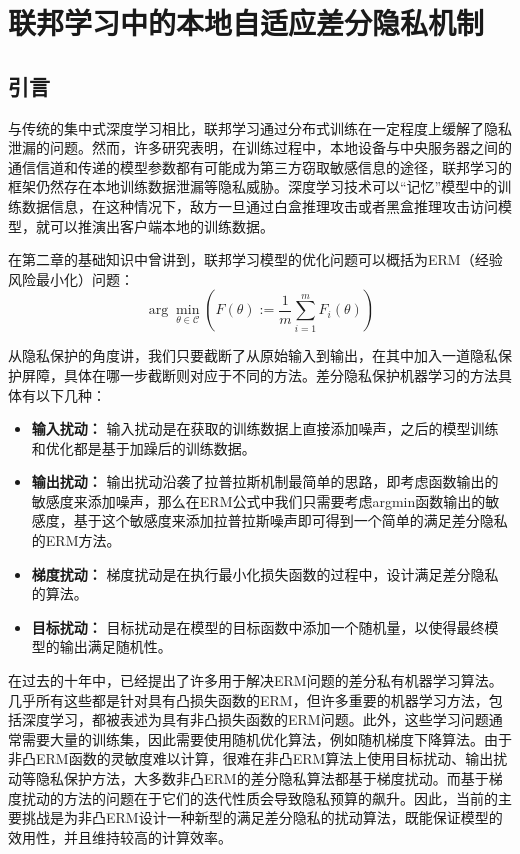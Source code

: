 \chapter{联邦学习中的本地自适应差分隐私机制}

\label{ch3}

\section{引言}
与传统的集中式深度学习相比，联邦学习通过分布式训练在一定程度上缓解了隐私泄漏的问题。然而，许多研究表明，在训练过程中，本地设备与中央服务器之间的通信信道和传递的模型参数都有可能成为第三方窃取敏感信息的途径，联邦学习的框架仍然存在本地训练数据泄漏等隐私威胁。深度学习技术可以“记忆”模型中的训练数据信息，在这种情况下，敌方一旦通过白盒推理攻击或者黑盒推理攻击访问模型，就可以推演出客户端本地的训练数据。

在第二章的基础知识中曾讲到，联邦学习模型的优化问题可以概括为ERM（经验风险最小化）问题：
\begin{equation}\label{eq:ERM}
\arg \min _{\theta \in \mathcal{C}}\left(F(\theta):=\frac{1}{m} \sum_{i=1}^{m} F_{i}(\theta)\right)
\end{equation}

从隐私保护的角度讲，我们只要截断了从原始输入到输出，在其中加入一道隐私保护屏障，具体在哪一步截断则对应于不同的方法。差分隐私保护机器学习的方法具体有以下几种：
\begin{itemize}
	\item \textbf{输入扰动：} 输入扰动是在获取的训练数据上直接添加噪声，之后的模型训练和优化都是基于加躁后的训练数据。
	\item \textbf{输出扰动：} 输出扰动沿袭了拉普拉斯机制最简单的思路，即考虑函数输出的敏感度来添加噪声，那么在ERM公式中我们只需要考虑argmin函数输出的敏感度，基于这个敏感度来添加拉普拉斯噪声即可得到一个简单的满足差分隐私的ERM方法。
	\item \textbf{梯度扰动：} 梯度扰动是在执行最小化损失函数的过程中，设计满足差分隐私的算法。
	\item \textbf{目标扰动：} 目标扰动是在模型的目标函数中添加一个随机量，以使得最终模型的输出满足随机性。
\end{itemize}

在过去的十年中，已经提出了许多用于解决ERM问题的差分私有机器学习算法。几乎所有这些都是针对具有凸损失函数的ERM，但许多重要的机器学习方法，包括深度学习，都被表述为具有非凸损失函数的ERM问题。此外，这些学习问题通常需要大量的训练集，因此需要使用随机优化算法，例如随机梯度下降算法。由于非凸ERM函数的灵敏度难以计算，很难在非凸ERM算法上使用目标扰动、输出扰动等隐私保护方法，大多数非凸ERM的差分隐私算法都基于梯度扰动。而基于梯度扰动的方法的问题在于它们的迭代性质会导致隐私预算的飙升。因此，当前的主要挑战是为非凸ERM设计一种新型的满足差分隐私的扰动算法，既能保证模型的效用性，并且维持较高的计算效率。

